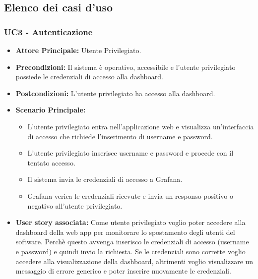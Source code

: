 \documentclass[11pt]{article}
\begin{document}
\begin{justify}
\subsection{Elenco dei casi d'uso}

\subsubsection{\textbf{UC3 - Autenticazione}}
\begin{itemize}
     \item \textbf{Attore Principale:} Utente Privilegiato.
     \item \textbf{Precondizioni:} Il sistema è operativo, accessibile e l'utente privilegiato possiede le credenziali di accesso alla dashboard.
     \item \textbf{Postcondizioni:} L'utente privilegiato ha accesso alla dashboard.
     \item \textbf{Scenario Principale:}
     \begin{itemize}
         \item L'utente privilegiato entra nell'applicazione web e visualizza un'interfaccia di accesso che richiede l'inserimento di username e password.
         \item L'utente privilegiato inserisce username e password e procede con il tentato accesso.
         \item Il sistema invia le credenziali di accesso a Grafana.
         \item Grafana verica le credenziali ricevute e invia un responso positivo o negativo all'utente privilegiato.
     \end{itemize}
     \item \textbf{User story associata:}
     Come utente privilegiato voglio poter accedere alla dashboard della web app per monitorare lo spostamento degli utenti del software. Perchè questo avvenga inserisco le credenziali di accesso (username e password) e quindi invio la richiesta. Se le credenziali sono corrette voglio accedere alla visualizzazione della dashboard, altrimenti voglio visualizzare un messaggio di errore generico e poter inserire nuovamente le credenziali.
\end{itemize}


\end{justify}
\end{document}
